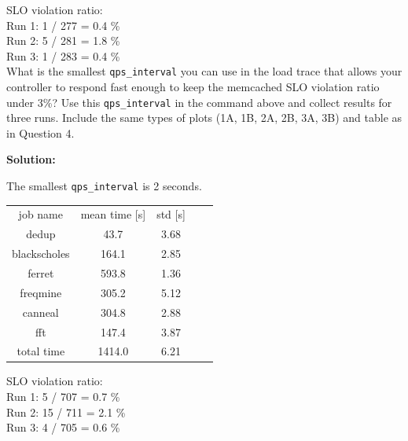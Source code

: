 \documentclass[11pt]{article}
\begin{document}
\begin{enumerate}
    SLO violation ratio: \\
    Run 1: 1 / 277 = 0.4 \% \\
    Run 2: 5 / 281 = 1.8 \% \\
    Run 3: 1 / 283 = 0.4 \%  \\
    
    What is the smallest \texttt{qps\_interval} you can use in the load trace that allows your controller to respond fast enough to keep the memcached SLO violation ratio under 3\%? Use this \texttt{qps\_interval} in the command above and collect results for three runs. Include the same types of plots (1A, 1B, 2A, 2B, 3A, 3B) and table as in Question 4. 
    
    \textbf{Solution:}
    
    The smallest \texttt{qps\_interval} is 2 seconds.

    \begin{table}[h]
        \centering
        \begin{tabular}{ |c|c|c|c|c|} 
        \hline
        job name & mean time [s] & std [s] \\
        \hhline{|=|=|=|}
        dedup         & 43.7 & 3.68 \\  \hline
        blackscholes  & 164.1 & 2.85 \\  \hline
        ferret        & 593.8 & 1.36 \\  \hline
        freqmine      & 305.2 & 5.12 \\  \hline
        canneal       & 304.8 & 2.88 \\  \hline
        fft           & 147.4 & 3.87 \\  \hline
        total time    & 1414.0 & 6.21 \\ \hline
        \end{tabular}
    \end{table}
    
    SLO violation ratio: \\
    Run 1: 5 / 707 = 0.7 \% \\
    Run 2: 15 / 711 = 2.1 \% \\
    Run 3: 4 / 705 = 0.6 \% \\
    

\end{enumerate}
\end{document}
